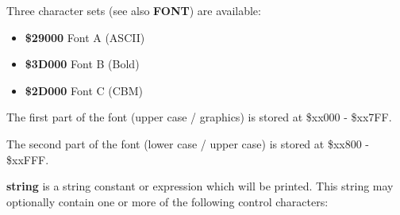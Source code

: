 \begin{description}[leftmargin=2cm,style=nextline]
                Three character sets (see also {\bf FONT}) are available:
                \begin{itemize}
                    \item {\bf \$29000} Font A (ASCII)
                    \item {\bf \$3D000} Font B (Bold)
                    \item {\bf \$2D000} Font C (CBM)
                \end{itemize}

                The first part of the font (upper case / graphics)
                is stored at \$xx000 - \$xx7FF.

                The second part of the font (lower case / upper case)
                is stored at \$xx800 - \$xxFFF.

                {\bf string} is a string constant or expression
                which will be printed. This string may optionally contain
                one or more of the following control characters:


\end{description}
